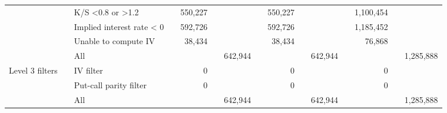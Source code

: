 \begin{tabular}{*{4}{l} *{11}{r} }
				  & & K/S <0.8 or >1.2 & &
				550,227 & &  & &
				550,227 & &  & &
				1,100,454 & &  \\
			
				  & & Implied interest rate < 0 & &
				592,726 & &  & &
				592,726 & &  & &
				1,185,452 & &  \\
			
				  & & Unable to compute IV & &
				38,434 & &  & &
				38,434 & &  & &
				76,868 & &  \\
			
				  & & All & &
				 & & 642,944 & &
				 & & 642,944 & &
				 & & 1,285,888 \\
			
				Level 3 filters & & IV filter & &
				0 & &  & &
				0 & &  & &
				0 & &  \\
			
				  & & Put-call parity filter & &
				0 & &  & &
				0 & &  & &
				0 & &  \\
			
				  & & All & &
				 & & 642,944 & &
				 & & 642,944 & &
				 & & 1,285,888 \\
			

	        \hline
	    \end{tabular}
	